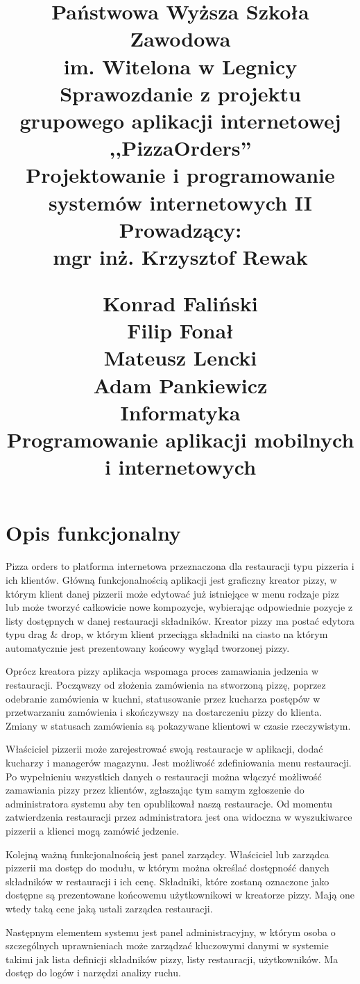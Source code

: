\documentclass[12pt]{article}
\title{
	\huge{Państwowa Wyższa Szkoła Zawodowa \\ im. Witelona w Legnicy} \\
	\vspace{2cm}
	\Huge{Sprawozdanie z projektu grupowego aplikacji internetowej ,,PizzaOrders''} \\
	\vspace{1cm}
	\Large{Projektowanie i programowanie systemów internetowych II} \\
	\vspace{5mm}
	\Large{Prowadzący:} \\
	mgr inż. Krzysztof Rewak
	\vspace{1cm}
	\begin{flushright}
	Konrad Faliński \\ Filip Fonał \\ Mateusz Lencki \\ Adam Pankiewicz \\
	\vspace{1cm}
	Informatyka \\ Programowanie aplikacji mobilnych i internetowych
	\end{flushright}
}
\begin{document}
\maketitle

\section{Opis funkcjonalny}
\vspace{1cm}
Pizza orders to platforma internetowa przeznaczona dla restauracji typu pizzeria i ich klientów. Główną funkcjonalnością aplikacji jest graficzny kreator pizzy, w którym klient danej pizzerii może edytować już istniejące w menu rodzaje pizz lub może tworzyć całkowicie nowe kompozycje, wybierając odpowiednie pozycje z listy dostępnych w danej restauracji składników. Kreator pizzy ma postać edytora typu drag \& drop, w którym klient przeciąga składniki na ciasto na którym automatycznie jest  prezentowany końcowy wygląd tworzonej pizzy.

Oprócz kreatora pizzy aplikacja wspomaga proces zamawiania jedzenia w restauracji. Począwszy od złożenia zamówienia na stworzoną pizzę, poprzez odebranie zamówienia w kuchni, statusowanie przez kucharza postępów w przetwarzaniu zamówienia i skończywszy na dostarczeniu pizzy do klienta. Zmiany w statusach zamówienia są pokazywane klientowi w czasie rzeczywistym.

Właściciel pizzerii może zarejestrować swoją restauracje w aplikacji, dodać kucharzy i managerów magazynu. Jest możliwość zdefiniowania menu restauracji.
Po wypełnieniu wszystkich danych o restauracji można włączyć możliwość zamawiania pizzy przez klientów, zgłaszając tym samym zgłoszenie do administratora systemu aby ten opublikował naszą restauracje. Od momentu zatwierdzenia restauracji przez administratora jest ona widoczna w wyszukiwarce pizzerii a klienci mogą zamówić jedzenie.

Kolejną ważną funkcjonalnością jest panel zarządcy. Właściciel lub zarządca pizzerii ma dostęp do modułu, w którym można określać dostępność danych składników w restauracji i ich cenę. Składniki, które zostaną oznaczone jako dostępne są prezentowane końcowemu użytkownikowi w kreatorze pizzy. Mają one wtedy taką cene jaką ustali zarządca restauracji.

Następnym elementem systemu jest panel administracyjny, w którym osoba o szczególnych uprawnieniach może  zarządzać kluczowymi danymi w systemie takimi jak lista definicji składników pizzy, listy restauracji, użytkowników. Ma dostęp do logów i narzędzi analizy ruchu.
\end{document}
